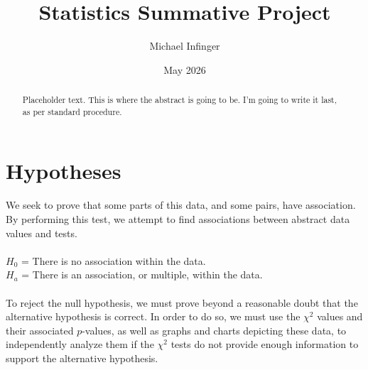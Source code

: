 \documentclass[12pt, letterpaper]{article}
\title{Statistics Summative Project}
\author{Michael Infinger}
\date{May 2026}
\begin{document}
\maketitle

\newpage

\begin{abstract}
    Placeholder text. This is where the abstract is going to be. I'm going to write it last, as per standard procedure.
\end{abstract}

\newpage

\tableofcontents

\newpage

\section{Hypotheses}
We seek to prove that some parts of this data, and some pairs, have association. By performing this test, we attempt to find associations between abstract data values and tests. \\ \\ 
$H_0$ = There is no association within the data. \\ 
$H_a$ = There is an association, or multiple, within the data. \\ \\ 
To reject the null hypothesis, we must prove beyond a reasonable doubt that the alternative hypothesis is correct. In order to do so, we must use the $\chi^2$ values and their associated $p$-values, as well as graphs and charts depicting these data, to independently analyze them if the $\chi^2$ tests do not provide enough information to support the alternative hypothesis.
\end{document}
